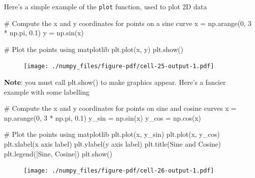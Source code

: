 \documentclass[
  letterpaper,
  DIV=11,
  numbers=noendperiod]{scrreprt}
\newenvironment{Shaded}{\begin{snugshade}}{\end{snugshade}}
\newcommand{\CommentTok}[1]{\textcolor[rgb]{0.37,0.37,0.37}{#1}}
\newcommand{\DecValTok}[1]{\textcolor[rgb]{0.68,0.00,0.00}{#1}}
\newcommand{\FloatTok}[1]{\textcolor[rgb]{0.68,0.00,0.00}{#1}}
\newcommand{\NormalTok}[1]{\textcolor[rgb]{0.00,0.23,0.31}{#1}}
\newcommand{\OperatorTok}[1]{\textcolor[rgb]{0.37,0.37,0.37}{#1}}
\newcommand{\StringTok}[1]{\textcolor[rgb]{0.13,0.47,0.30}{#1}}
\theoremstyle{definition}
\theoremstyle{remark}
\begin{document}
Here's a simple example of the \texttt{plot} function, used to plot 2D
data

\begin{Shaded}
\begin{Highlighting}[]
\CommentTok{\# Compute the x and y coordinates for points on a sine curve}
\NormalTok{x }\OperatorTok{=}\NormalTok{ np.arange(}\DecValTok{0}\NormalTok{, }\DecValTok{3} \OperatorTok{*}\NormalTok{ np.pi, }\FloatTok{0.1}\NormalTok{)}
\NormalTok{y }\OperatorTok{=}\NormalTok{ np.sin(x)}

\CommentTok{\# Plot the points using matplotlib}
\NormalTok{plt.plot(x, y)}
\NormalTok{plt.show()}
\end{Highlighting}
\end{Shaded}

\begin{figure}[H]

{\centering \texttt{[image: ./numpy\_files/figure-pdf/cell-25-output-1.pdf]}

}

\end{figure}

\textbf{Note}: you must call plt.show() to make graphics appear. Here's
a fancier example with some labelling

\begin{Shaded}
\begin{Highlighting}[]
\CommentTok{\# Compute the x and y coordinates for points on sine and cosine curves}
\NormalTok{x }\OperatorTok{=}\NormalTok{ np.arange(}\DecValTok{0}\NormalTok{, }\DecValTok{3} \OperatorTok{*}\NormalTok{ np.pi, }\FloatTok{0.1}\NormalTok{)}
\NormalTok{y\_sin }\OperatorTok{=}\NormalTok{ np.sin(x)}
\NormalTok{y\_cos }\OperatorTok{=}\NormalTok{ np.cos(x)}

\CommentTok{\# Plot the points using matplotlib}
\NormalTok{plt.plot(x, y\_sin)}
\NormalTok{plt.plot(x, y\_cos)}
\NormalTok{plt.xlabel(}\StringTok{\textquotesingle{}x axis label\textquotesingle{}}\NormalTok{)}
\NormalTok{plt.ylabel(}\StringTok{\textquotesingle{}y axis label\textquotesingle{}}\NormalTok{)}
\NormalTok{plt.title(}\StringTok{\textquotesingle{}Sine and Cosine\textquotesingle{}}\NormalTok{)}
\NormalTok{plt.legend([}\StringTok{\textquotesingle{}Sine\textquotesingle{}}\NormalTok{, }\StringTok{\textquotesingle{}Cosine\textquotesingle{}}\NormalTok{])}
\NormalTok{plt.show()}
\end{Highlighting}
\end{Shaded}

\begin{figure}[H]

{\centering \texttt{[image: ./numpy\_files/figure-pdf/cell-26-output-1.pdf]}

}

\end{figure}
\end{document}
